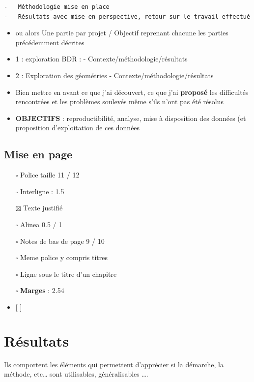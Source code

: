 \documentclass[
  a4paper,
]{scrbook}
\begin{document}
\begin{verbatim}
-   Méthodologie mise en place
-   Résultats avec mise en perspective, retour sur le travail effectué
\end{verbatim}

\begin{itemize}
\item
  ou alors Une partie par projet / Objectif reprenant chacune les
  parties précédemment décrites
\item
  1 : exploration BDR : - Contexte/méthodologie/résultats
\item
  2 : Exploration des géométries - Contexte/méthodologie/résultats
\item
  Bien mettre en avant ce que j'ai découvert, ce que j'ai
  \textbf{proposé} les difficultés rencontrées et les problèmes soulevés
  même s'ils n'ont pas été résolus
\item
  \textbf{OBJECTIFS} : reproductibilité, analyse, mise à disposition des
  données (et proposition d'exploitation de ces données
\end{itemize}

\hypertarget{mise-en-page}{%
\section{Mise en page}\label{mise-en-page}}

\begin{itemize}
\item[$\square$]
  Police taille 11 / 12
\item[$\square$]
  Interligne : 1.5
\item[$\boxtimes$]
  Texte justifié
\item[$\square$]
  Alinea 0.5 / 1
\item[$\square$]
  Notes de bas de page 9 / 10
\item[$\square$]
  Meme police y compris titres
\item[$\square$]
  Ligne sous le titre d'un chapitre
\item[$\square$]
  \textbf{Marges} : 2.54
\item
  {[} {]}
\end{itemize}

\hypertarget{ruxe9sultats}{%
\chapter{Résultats}\label{ruxe9sultats}}

Ils comportent les éléments qui permettent d'apprécier si la démarche,
la méthode, etc\ldots{} sont utilisables, généralisables \ldots.
\end{document}
